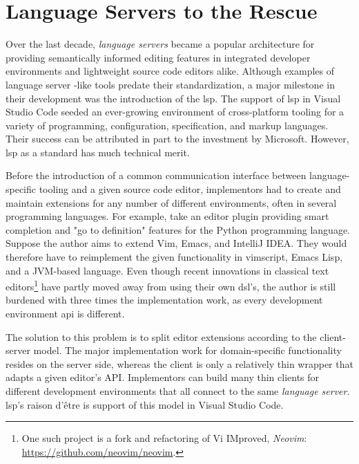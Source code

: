 \section*{Language Servers to the Rescue}

Over the last decade, \emph{language servers} became a popular
architecture\cite{barros2022editing} for providing semantically informed editing
features in integrated developer environments and lightweight source code
editors alike. Although examples of language server -like tools predate their
standardization\cite{bour2018merlin}, a major milestone in their development was
the introduction of the \acrfull{lsp}. The support of \acrshort{lsp} in Visual
Studio Code seeded an ever-growing environment of cross-platform tooling for a
variety of programming, configuration, specification, and markup languages.
Their success can be attributed in part to the investment by Microsoft. However,
\acrshort{lsp} as a standard has much technical merit.

Before the introduction of a common communication interface between
language-specific tooling and a given source code editor, implementors had to
create and maintain extensions for any number of different environments, often
in several programming languages. For example, take an editor plugin providing
smart completion and "go to definition" features for the Python programming
language. Suppose the author aims to extend Vim, Emacs, and IntelliJ IDEA. They
would therefore have to reimplement the given functionality in vimscript, Emacs
Lisp, and a JVM-based language. Even though recent innovations in classical text
editors\footnote{One such project is a fork and refactoring of Vi IMproved,
\emph{Neovim}: \url{https://github.com/neovim/neovim}.} have partly moved away
from using their own \acrshort{dsl}'s, the author is still burdened with three
times the implementation work, as every development environment \acrshort{api}
is different.

The solution to this problem is to split editor extensions according to the
client-server model. The major implementation work for domain-specific
functionality resides on the server side, whereas the client is only a
relatively thin wrapper that adapts a given editor's API. Implementors can build
many thin clients for different development environments that all connect to the
same \emph{language server}. \acrshort{lsp}'s raison d'être is support of this
model in Visual Studio Code.

